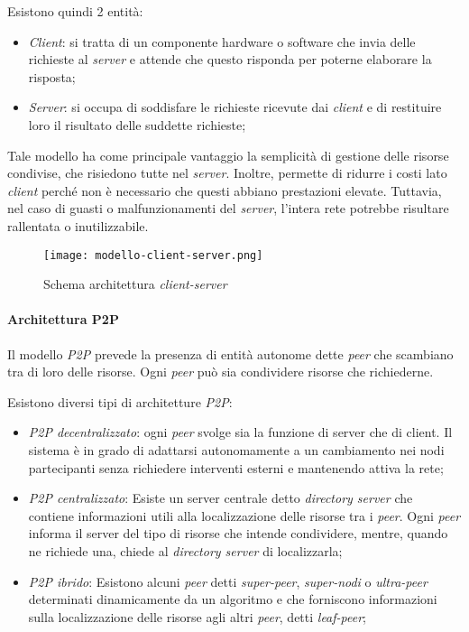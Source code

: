 \bigskip\noindent
Esistono quindi 2 entità:
\begin{itemize}
    \item \emph{Client}: si tratta di un componente hardware o software che invia
    delle richieste al \emph{server} e attende che questo risponda per poterne
    elaborare la risposta;
    \item \emph{Server}: si occupa di soddisfare le richieste ricevute dai
    \emph{client} e di restituire loro il risultato delle suddette richieste;
\end{itemize}
Tale modello ha come principale vantaggio la semplicità di gestione delle risorse
condivise, che risiedono tutte nel \emph{server}. Inoltre, permette di ridurre i
costi lato \emph{client} perché non è necessario che questi abbiano prestazioni
elevate. Tuttavia, nel caso di guasti o malfunzionamenti del \emph{server},
l’intera rete potrebbe risultare rallentata o inutilizzabile.

\begin{figure}[h]
    \centering
    \texttt{[image: modello-client-server.png]}
    \caption{Schema architettura \emph{client-server}}
\end{figure}

\paragraph{Architettura P2P}
Il modello \emph{P2P} prevede la presenza di entità autonome dette \emph{peer}
che scambiano tra di loro delle risorse. Ogni \emph{peer} può sia condividere
risorse che richiederne.

Esistono diversi tipi di architetture \emph{P2P}:
\begin{itemize}
    \item \emph{P2P decentralizzato}: ogni \emph{peer} svolge sia la funzione di
    server che di client. Il sistema è in grado di adattarsi autonomamente a un
    cambiamento nei nodi partecipanti senza richiedere interventi esterni e
    mantenendo attiva la rete;
    \item \emph{P2P centralizzato}: Esiste un server centrale detto
    \emph{directory server} che contiene informazioni utili alla localizzazione
    delle risorse tra i \emph{peer}. Ogni \emph{peer} informa il server del
    tipo di risorse che intende condividere, mentre, quando ne richiede una,
    chiede al \emph{directory server} di localizzarla;
    \item \emph{P2P ibrido}: Esistono alcuni \emph{peer} detti \emph{super-peer},
    \emph{super-nodi} o \emph{ultra-peer} determinati dinamicamente da un algoritmo
    e che forniscono informazioni sulla localizzazione delle risorse agli altri
    \emph{peer}, detti \emph{leaf-peer};
\end{itemize}

